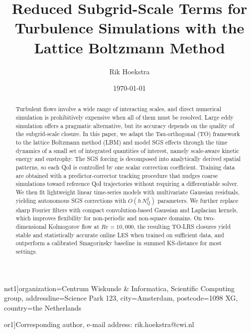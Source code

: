 \documentclass[]{elsarticle}
\title{Reduced Subgrid-Scale Terms for Turbulence Simulations with the Lattice Boltzmann Method}
\date{\today}
\def\corref#1{}%
\def\cortext#1#2{}%
\def\affiliation#1#2{}%
\begin{document}
\begin{frontmatter}
\author[inst1]{Rik Hoekstra \corref{cor1}}
\affiliation[inst1]{organization={Centrum Wiskunde \& Informatica, Scientific Computing group},%
            addressline={Science Park 123}, 
            city={Amsterdam},
            postcode={1098 XG}, 
            country={the Netherlands}}


\cortext[cor1]{Corresponding author, e-mail address: rik.hoekstra@cwi.nl}

\begin{abstract}
Turbulent flows involve a wide range of interacting scales, and direct numerical simulation is prohibitively expensive when all of them must be resolved. Large eddy simulation offers a pragmatic alternative, but its accuracy depends on the quality of the subgrid-scale closure. In this paper, we adapt the Tau-orthogonal (TO) framework to the lattice Boltzmann method (LBM) and model SGS effects through the time dynamics of a small set of integrated quantities of interest, namely scale-aware kinetic energy and enstrophy. The SGS forcing is decomposed into analytically derived spatial patterns, so each QoI is controlled by one scalar correction coefficient. Training data are obtained with a predictor-corrector tracking procedure that nudges coarse simulations toward reference QoI trajectories without requiring a differentiable solver. We then fit lightweight linear time-series models with multivariate Gaussian residuals, yielding autonomous SGS corrections with $O(h\,N_Q^2)$ parameters. We further replace sharp Fourier filters with compact convolution-based Gaussian and Laplacian kernels, which improves flexibility for non-periodic and non-square domains. On two-dimensional Kolmogorov flow at $Re=10{,}000$, the resulting TO-LRS closures yield stable and statistically accurate online LES when trained on sufficient data, and outperform a calibrated Smagorinsky baseline in summed KS-distance for most settings.
\end{abstract}
\end{frontmatter}




\end{document}

